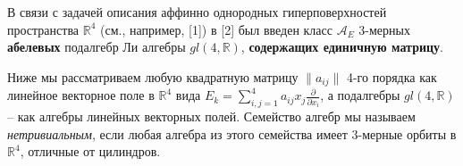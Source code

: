 \documentclass{vzmsthesis}
\begin{document}

\vzmscaption

В связи с задачей описания аффинно однородных гиперповерхностей пространства $\mathbb{R}^4$ (см., например, [1]) в [2] был введен класс $\mathcal{A}_E$ 3-мерных \textbf{абелевых} подалгебр Ли алгебры $gl(4,\mathbb{R})$,  \textbf{содержащих единичную матрицу}.

Ниже мы рассматриваем любую квадратную матрицу $ \|a_{ij}\| $ 4-го порядка как линейное векторное поле в $\mathbb{R}^4 $ вида $E_k = \sum_{i,j =1 }^4 {a_{ij} x_j} \frac{\partial}{\partial x_i}$, а подалгебры $gl(4,\mathbb{R})$ --  как алгебры линейных векторных полей. Семейство алгебр мы называем \textit{нетривиальным}, если любая алгебра из этого семейства имеет 3-мерные орбиты в $\mathbb{R}^4$, отличные от цилиндров.
\end{document}
